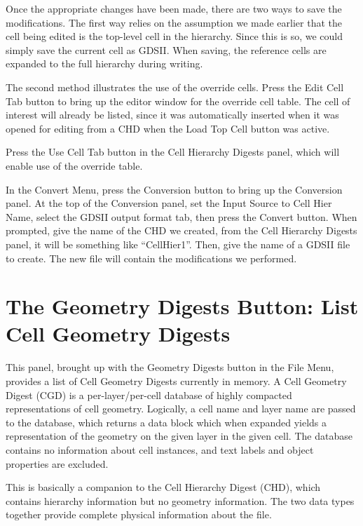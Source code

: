 Once the appropriate changes have been made, there are two ways to
save the modifications.  The first way relies on the assumption we
made earlier that the cell being edited is the top-level cell in the
hierarchy.  Since this is so, we could simply save the current cell as
GDSII.  When saving, the reference cells are expanded to the full
hierarchy during writing.

The second method illustrates the use of the override cells.  Press
the {\cb Edit Cell Tab} button to bring up the editor window for the
override cell table.  The cell of interest will already be listed,
since it was automatically inserted when it was opened for editing
from a CHD when the {\cb Load Top Cell} button was active.

Press the {\cb Use Cell Tab} button in the {\cb Cell Hierarchy
Digests} panel, which will enable use of the override table.

In the {\cb Convert Menu}, press the {\cb Conversion} button to bring
up the {\cb Conversion} panel.  At the top of the {\cb Conversion}
panel, set the {\cb Input Source} to {\cb Cell Hier Name}, select the
{\cb GDSII} output format tab, then press the {\cb Convert} button. 
When prompted, give the name of the CHD we created, from the {\cb Cell
Hierarchy Digests} panel, it will be something like ``CellHier1''. 
Then, give the name of a GDSII file to create.  The new file will
contain the modifications we performed.


\section{The {\cb Geometry Digests} Button: List {\cb Cell Geometry Digests}}

This panel, brought up with the {\cb Geometry Digests} button in the
{\cb File Menu}, provides a list of Cell Geometry Digests currently in
memory.  A Cell Geometry Digest (CGD) is a per-layer/per-cell database
of highly compacted representations of cell geometry.  Logically, a
cell name and layer name are passed to the database, which returns a
data block which when expanded yields a representation of the geometry
on the given layer in the given cell.  The database contains no
information about cell instances, and text labels and object
properties are excluded.

This is basically a companion to the Cell Hierarchy Digest (CHD),
which contains hierarchy information but no geometry information.  The
two data types together provide complete physical information about
the file.

